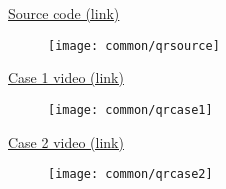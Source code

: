 \begin{appendices}

\centering
\href{https://github.com/ngeri/traffic-sim}{Source code (link)}
\begin{figure}[ht]
	\centering
	\texttt{[image: common/qrsource]}
\end{figure}

\href{https://youtu.be/wSFh_gOpIFU}{Case 1 video (link)}
\begin{figure}[ht]
	\centering
	\texttt{[image: common/qrcase1]}
\end{figure}

\href{https://youtu.be/hluDHotqKyE}{Case 2 video (link)}
\begin{figure}[ht]
	\centering
	\texttt{[image: common/qrcase2]}
\end{figure}

\end{appendices}